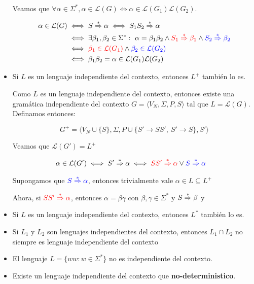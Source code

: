 \begin{itemize}
\begin{demo}[0.8\textwidth]
          Veamos que \(\forall\alpha\in\Sigma^*, \alpha\in\mathcal{L}(G) \iff \alpha\in\mathcal{L}(G_1)\mathcal{L}(G_2)\).

          \begin{align*}
            \alpha\in\mathcal{L}(G) & \iff S\overset{*}{\Rightarrow}\alpha \iff S_1S_2\overset{*}{\Rightarrow}\alpha                                                                            \\
                                    & \iff\exists\beta_1,\beta_2\in\Sigma^*:~\alpha=\beta_1\beta_2\land {\color{red}S_1\overset{*}{\Rightarrow}\beta_1}\land {\color{blue}S_2\overset{*}{\Rightarrow}\beta_2} \\
                                    & \iff{\color{red}\beta_1\in\mathcal{L}(G_1)} \land {\color{blue}\beta_2\in\mathcal{L}(G_2)}                                            \\
                                    & \iff \beta_1\beta_2 = \alpha\in\mathcal{L}(G_1)\mathcal{L}(G_2)                                                         \\
          \end{align*}
        \end{demo}
  \item Si \(L\) es un lenguaje independiente del contexto, entonces \(L^+\) también lo es.
        \begin{demo}[0.8\textwidth]
          Como \(L\) es un lenguaje independiente del contexto, entonces existe una gramática independiente del contexto \(G=\langle V_N, \Sigma, P, S \rangle\) tal que \(L = \mathcal{L}(G)\). Definamos entonces:

          \[ G^+ = \langle V_N \cup \{S\}, \Sigma, P \cup \{ S' \to SS',~S'\to S\}, S'\rangle \]

          Veamos que \(\mathcal{L}(G') = L^+ \)

          \begin{align*}
            \alpha\in\mathcal{L}(G') & \iff S'\overset{*}{\Rightarrow}\alpha \iff {\color{red}SS' \overset{*}{\Rightarrow}\alpha}\lor{\color{blue}S\overset{*}{\Rightarrow}\alpha}
          \end{align*}

          Supongamos que \({\color{blue}S\overset{*}{\Rightarrow}\alpha}\), entonces trivialmente vale \(\alpha\in L\subseteq L^+\)

          Ahora, si \({\color{red}SS'\overset{*}{\Rightarrow}\alpha}\), entonces \(\alpha = \beta\gamma\) con \(\beta,\gamma\in\Sigma^*\) y \(S\overset{*}{\Rightarrow}\beta\) y
        \end{demo}
  \item  Si \(L\) es un lenguaje independiente del contexto, entonces \(L^*\) también lo es. 
  \item Si \(L_1\) y \(L_2\) son lenguajes independientes del contexto, entonces \(L_1\cap L_2\) no siempre es lenguaje independiente del contexto 
  \item El lenguaje \(L = \{ ww : w \in \Sigma^* \}\) no es independiente del contexto. 
  \item Existe un lenguaje independiente del contexto que \textbf{no-deterministico}. 
\end{itemize}

